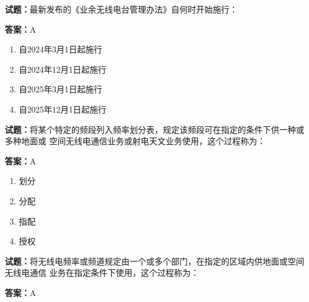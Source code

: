 \documentclass{ctexbook}
\begin{document}





\vspace{1em}

\textbf{试题：}最新发布的《业余无线电台管理办法》自何时开始施行： 

\textbf{答案：}A 

\begin{enumerate}[leftmargin=3em]
  \item 自2024年3月1日起施行 

  \item 自2024年12月1日起施行 

  \item 自2025年3月1日起施行 

  \item 自2025年12月1日起施行 

\end{enumerate}





\vspace{1em}

\textbf{试题：}将某个特定的频段列入频率划分表，规定该频段可在指定的条件下供一种或多种地面或
空间无线电通信业务或射电天文业务使用，这个过程称为： 

\textbf{答案：}A 

\begin{enumerate}[leftmargin=3em]
  \item 划分 

  \item 分配 

  \item 指配 

  \item 授权 

\end{enumerate}





\vspace{1em}

\textbf{试题：}将无线电频率或频道规定由一个或多个部门，在指定的区域内供地面或空间无线电通信
业务在指定条件下使用，这个过程称为： 

\textbf{答案：}A 
\end{document}
